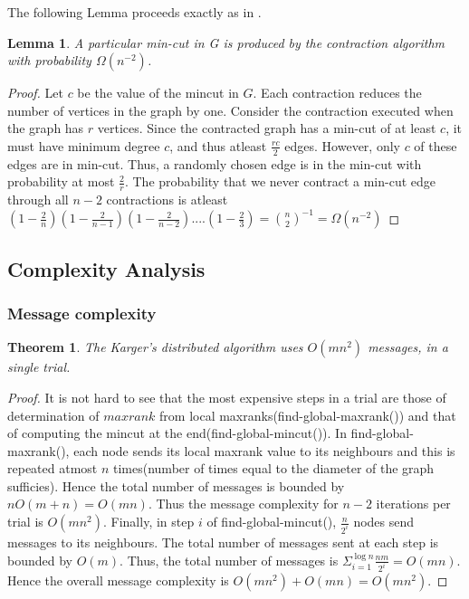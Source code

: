 \documentclass{acm_proc_article-sp}
\begin{document}
The following Lemma proceeds exactly as in \cite{NRMM97}.
\newtheorem{mydef13}[mydef12]{Lemma}
\begin{mydef13}
 A particular min-cut in G is produced by the contraction algorithm with probability $\Omega(n^{-2})$.
\end{mydef13}

\begin{proof}
Let $c$ be the value of the mincut in $G$. Each contraction reduces the number of vertices in the graph by one. Consider the contraction executed when the graph has $r$ vertices. Since the contracted graph has a min-cut of at least $c$, it must have minimum degree $c$, and thus atleast $\frac{rc}{2}$ edges. However, only $c$ of these edges are in min-cut. Thus, a randomly chosen edge is in the min-cut with probability at most $\frac{2}{r}$. The probability that we never contract a min-cut edge through all $n-2$ contractions is atleast
$(1-\frac{2}{n})(1-\frac{2}{n-1})(1-\frac{2}{n-2})....(1-\frac{2}{3}) = \binom{n}{2}^{-1} = \Omega(n^{-2})$
\end{proof}

\newpage

\subsection{Complexity Analysis}
\subsubsection{Message complexity}
\newtheorem{mydef14}{Theorem}[subsection]
\begin{mydef14}
 The Karger's distributed algorithm uses $O(mn^{2})$ messages, in a single trial.
\end{mydef14}

\begin{proof}
It is not hard to see that the most expensive steps in a trial are those of determination of $maxrank$ from local maxranks(find-global-maxrank()) and that of computing the mincut at the end(find-global-mincut()). In find-global-maxrank(), each node sends its local maxrank value to its neighbours and this is repeated atmost $n$ times(number of times equal to the diameter of the graph sufficies). Hence the total number of messages is bounded by $nO(m+n) = O(mn)$. Thus the message complexity for $n-2$ iterations per trial is $O(mn^{2})$.  Finally, in step $i$ of find-global-mincut(), $\frac{n}{2^{i}}$ nodes send messages to its neighbours. The total number of messages sent at each step is bounded by $O(m)$. Thus, the total number of messages is $\Sigma_{i=1}^{\log{n}} \frac{nm}{2^{i}} = O(mn)$.  Hence the overall message complexity is $O(mn^{2}) + O(mn) = O(mn^{2})$.
\end{proof}
\end{document}
